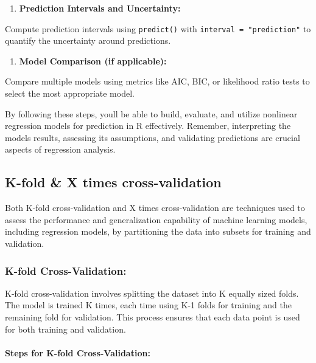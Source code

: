 \documentclass[
]{article}
\begin{document}
\begin{enumerate}
\def\labelenumi{\arabic{enumi}.}
\item
  \textbf{Prediction Intervals and Uncertainty:}
\end{enumerate}

Compute prediction intervals using \texttt{predict()} with
\texttt{interval\ =\ "prediction"} to quantify the uncertainty around
predictions.

\begin{enumerate}
\def\labelenumi{\arabic{enumi}.}
\item
  \textbf{Model Comparison (if applicable):}
\end{enumerate}

Compare multiple models using metrics like AIC, BIC, or likelihood ratio
tests to select the most appropriate model.

By following these steps, you\textquotesingle ll be able to build,
evaluate, and utilize nonlinear regression models for prediction in R
effectively. Remember, interpreting the model\textquotesingle s results,
assessing its assumptions, and validating predictions are crucial
aspects of regression analysis.

\hypertarget{k-fold--x-times-cross-validation}{%
\subsection{\texorpdfstring{\textbf{K-fold} \& \textbf{X times}
cross-validation}{K-fold \& X times cross-validation}}\label{k-fold--x-times-cross-validation}}

Both K-fold cross-validation and X times cross-validation are techniques
used to assess the performance and generalization capability of machine
learning models, including regression models, by partitioning the data
into subsets for training and validation.

\hypertarget{k-fold-cross-validation}{%
\subsubsection{K-fold Cross-Validation:}\label{k-fold-cross-validation}}

K-fold cross-validation involves splitting the dataset into K equally
sized folds. The model is trained K times, each time using K-1 folds for
training and the remaining fold for validation. This process ensures
that each data point is used for both training and validation.

\hypertarget{steps-for-k-fold-cross-validation}{%
\paragraph{Steps for K-fold
Cross-Validation:}\label{steps-for-k-fold-cross-validation}}
\end{document}
